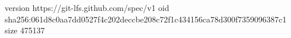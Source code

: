 version https://git-lfs.github.com/spec/v1
oid sha256:061d8c0aa7dd0527f4c202deccbe208c72f1c434156ca78d300f7359096387c1
size 475137
